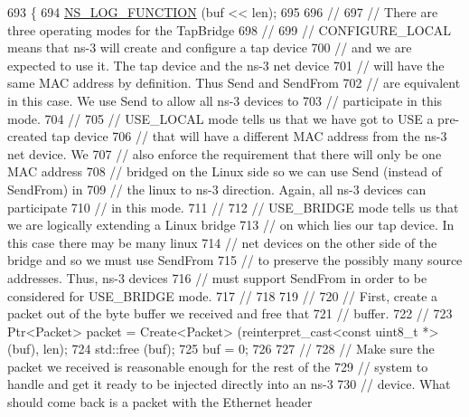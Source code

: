 \begin{DoxyCode}
693 \{
694   \hyperlink{log-macros-disabled_8h_a90b90d5bad1f39cb1b64923ea94c0761}{NS\_LOG\_FUNCTION} (buf << len);
695 
696   \textcolor{comment}{//}
697   \textcolor{comment}{// There are three operating modes for the TapBridge}
698   \textcolor{comment}{//}
699   \textcolor{comment}{// CONFIGURE\_LOCAL means that ns-3 will create and configure a tap device}
700   \textcolor{comment}{// and we are expected to use it.  The tap device and the ns-3 net device}
701   \textcolor{comment}{// will have the same MAC address by definition.  Thus Send and SendFrom}
702   \textcolor{comment}{// are equivalent in this case.  We use Send to allow all ns-3 devices to}
703   \textcolor{comment}{// participate in this mode.}
704   \textcolor{comment}{//}
705   \textcolor{comment}{// USE\_LOCAL mode tells us that we have got to USE a pre-created tap device}
706   \textcolor{comment}{// that will have a different MAC address from the ns-3 net device.  We }
707   \textcolor{comment}{// also enforce the requirement that there will only be one MAC address}
708   \textcolor{comment}{// bridged on the Linux side so we can use Send (instead of SendFrom) in}
709   \textcolor{comment}{// the linux to ns-3 direction.  Again, all ns-3 devices can participate}
710   \textcolor{comment}{// in this mode.}
711   \textcolor{comment}{//}
712   \textcolor{comment}{// USE\_BRIDGE mode tells us that we are logically extending a Linux bridge}
713   \textcolor{comment}{// on which lies our tap device.  In this case there may be many linux}
714   \textcolor{comment}{// net devices on the other side of the bridge and so we must use SendFrom}
715   \textcolor{comment}{// to preserve the possibly many source addresses.  Thus, ns-3 devices }
716   \textcolor{comment}{// must support SendFrom in order to be considered for USE\_BRIDGE mode.}
717   \textcolor{comment}{//}
718 
719   \textcolor{comment}{//}
720   \textcolor{comment}{// First, create a packet out of the byte buffer we received and free that}
721   \textcolor{comment}{// buffer.}
722   \textcolor{comment}{//}
723   Ptr<Packet> packet = Create<Packet> (\textcolor{keyword}{reinterpret\_cast<}\textcolor{keyword}{const }uint8\_t *\textcolor{keyword}{>} (buf), len);
724   std::free (buf);
725   buf = 0;
726 
727   \textcolor{comment}{//}
728   \textcolor{comment}{// Make sure the packet we received is reasonable enough for the rest of the }
729   \textcolor{comment}{// system to handle and get it ready to be injected directly into an ns-3}
730   \textcolor{comment}{// device.  What should come back is a packet with the Ethernet header }

\end{DoxyCode}
